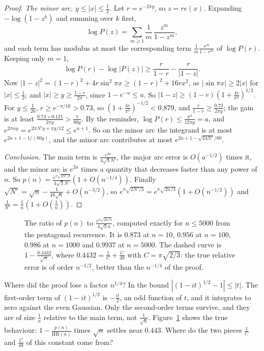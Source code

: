 \begin{proof}
\emph{The minor arc, $y\le|x|\le\frac12$.} Let $r=e^{-2\pi y}$, so $z=re(x)$. Expanding $-\log(1-z^k)$ and summing over $k$ first,
\[
\log P(z)=\sum_{m\ge1}\frac1m\,\frac{z^m}{1-z^m},
\]
and each term has modulus at most the corresponding term $\frac1m\frac{r^m}{1-r^m}$ of $\log P(r)$. Keeping only $m=1$,
\[
\log P(r)-\log|P(z)|\ge\frac r{1-r}-\frac r{|1-z|}.
\]
Now $|1-z|^2=(1-r)^2+4r\sin^2\pi x\ge(1-r)^2+16rx^2$, as $|\sin\pi x|\ge2|x|$ for $|x|\le\frac12$; and $|x|\ge y\ge\frac{1-r}{2\pi}$, since $1-e^{-u}\le u$. So $|1-z|\ge(1-r)(1+\frac{4r}{\pi^2})^{1/2}$. For $y\le\frac1{20}$, $r\ge e^{-\pi/10}>0.73$, so $(1+\frac{4r}{\pi^2})^{-1/2}<0.879$, and $\frac r{1-r}\ge\frac{0.73}{2\pi y}$; the gain is at least $\frac{0.73\times0.121}{2\pi y}>\frac1{80y}$. By the reminder, $\log P(r)\le\frac{\pi^2}{12\pi y}=a$, and $e^{2\pi ny}=e^{2\pi N'y+\pi y/12}\le e^{a+1}$. So on the minor arc the integrand is at most $e^{2a+1-1/(80y)}$, and the minor arc contributes at most $e^{2a+1-\sqrt{24N'}/80}$.

\emph{Conclusion.} The main term is $\frac{e^{2a}}{4\sqrt3N'}$, the major arc error is $O(a^{-1/2})$ times it, and the minor arc is $e^{2a}$ times a quantity that decreases faster than any power of $n$. So $p(n)=\frac{e^{\pi\sqrt{2N'/3}}}{4\sqrt3N'}(1+O(n^{-1/4}))$. Finally $\sqrt{N'}=\sqrt n-\frac1{48\sqrt n}+O(n^{-3/2})$, so $e^{\pi\sqrt{2N'/3}}=e^{\pi\sqrt{2n/3}}(1+O(n^{-1/2}))$ and $\frac1{N'}=\frac1n(1+O(\frac1n))$.
\end{proof}

\begin{figure}[ht]
\centering
{}
\caption{The ratio of $p(n)$ to $\frac{e^{\pi\sqrt{2n/3}}}{4\sqrt3n}$, computed exactly for $n\le5000$ from the pentagonal recurrence. It is $0.873$ at $n=10$, $0.956$ at $n=100$, $0.986$ at $n=1000$ and $0.9937$ at $n=5000$. The dashed curve is $1-\frac{0.4432}{\sqrt n}$, where $0.4432=\frac1C+\frac C{48}$ with $C=\pi\sqrt{2/3}$: the true relative error is of order $n^{-1/2}$, better than the $n^{-1/4}$ of the proof.}
\label{fig:hrratio}
\end{figure}

\begin{think}
Where did the proof lose a factor $n^{1/4}$? In the bound $|(1-it)^{1/2}-1|\le|t|$. The first-order term of $(1-it)^{1/2}$ is $-\frac{it}2$, an odd function of $t$, and it integrates to zero against the even Gaussian. Only the second-order terms survive, and they are of size $\frac1a$ relative to the main term, not $\frac1{\sqrt a}$. Figure~\ref{fig:hrratio} shows the true behaviour: $1-\frac{p(n)}{\mathrm{HR}(n)}$ times $\sqrt n$ settles near $0.443$. Where do the two pieces $\frac1C$ and $\frac C{48}$ of this constant come from?
\end{think}

